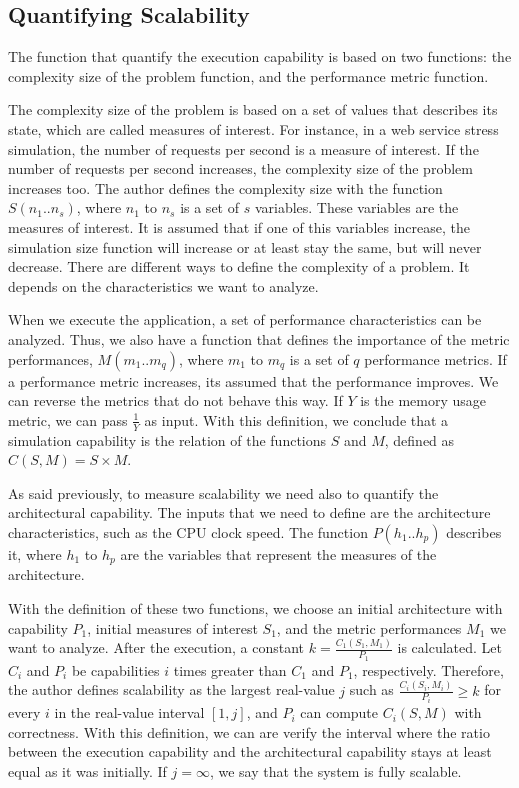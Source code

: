 \subsection{Quantifying Scalability}
\label{quantifyingScalability}

The function that quantify the execution capability is based on two functions: the complexity size of the problem function, and the performance metric function. 

The complexity size of the problem is based on a set of values that describes its state, which are called measures of interest. For instance, in a web service stress simulation, the number of requests per second is a measure of interest. If the number of requests per second increases, the complexity size of the problem increases too. The author defines the complexity size with the function $S(n_{1}..n_{s})$, where $n_{1}$ to $n_{s}$ is a set of $s$ variables. These variables are the measures of interest. It is assumed that if one of this variables increase, the simulation size function will increase or at least stay the same, but will never decrease. There are different ways to define the complexity of a problem. It depends on the characteristics we want to analyze.

When we execute the application, a set of performance characteristics can be analyzed. Thus, we also have a function that defines the importance of the metric performances, $M(m_{1}..m_{q})$, where $m_{1}$ to $m_{q}$ is a set of $q$ performance metrics. If a performance metric increases, its assumed that the performance improves. We can reverse the metrics that do not behave this way. If $Y$ is the memory usage metric, we can pass $\frac{1}{Y}$ as input. With this definition, we conclude that a simulation capability is the relation of the functions $S$ and $M$, defined as $C(S,M) = S \times M$.

As said previously, to measure scalability we need also to quantify the architectural capability. The inputs that we need to define are the architecture characteristics, such as the CPU clock speed. The function $P(h_{1}..h_{p})$ describes it, where $h_{1}$ to $h_{p}$ are the variables that represent the measures of the architecture.

With the definition of these two functions, we choose an initial architecture with capability $P_{1}$, initial measures of interest $S_{1}$, and the metric performances $M_{1}$ we want to analyze. After the execution, a constant $k = \frac{C_{1}(S_{1},M_{1})}{P_{1}}$ is calculated. Let $C_{i}$ and $P_{i}$ be capabilities $i$ times greater than $C_{1}$ and $P_{1}$, respectively. Therefore, the author defines scalability as the largest real-value $j$ such as $\frac{C_{i}(S_{i},M_{i})}{P_{i}} \geq k$ for every $i$ in the real-value interval $[1,j]$, and $P_{i}$ can compute $C_{i}(S,M)$ with correctness. With this definition, we can are verify the interval where the ratio between the execution capability and the architectural capability stays at least equal as it was initially. If $j = \infty$, we say that the system is fully scalable.


